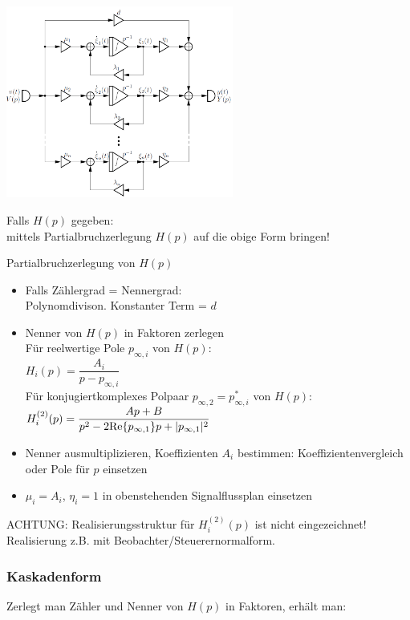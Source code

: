 \documentclass[a4paper,landscape,6pt]{article}
\begin{document}
\begin{multicols}{3}
\begin{minipage}[h]{0.5\textwidth}
	\includegraphics[width=0.56\textwidth]{images_ssp/Parallelform}\\
\end{minipage}
\newpage
Falls  $H(p)$  gegeben:\\
mittels Partialbruchzerlegung $H(p)$ auf die obige Form bringen!
\begin{cookbox}{Partialbruchzerlegung von $H(p)$}
	\begin{itemize}
		\item[1)] Falls Zählergrad = Nennergrad:\\ Polynomdivison. Konstanter Term = $d$
		\item[2)] Nenner von $H(p)$ in Faktoren zerlegen\\
		Für reelwertige Pole $p_{\infty,i}$ von $H(p)$:\\
		$H_i(p) = \dfrac{A_i}{p - p_{\infty,i}}$\\
		Für konjugiertkomplexes Polpaar $p_{\infty,2} = p_{\infty,i}^*$ von $H(p)$:\\
		$H_i^{(2)}(p) = \dfrac{A p + B}{p^2 - 2 \textmd{Re}{\{p_{\infty,1}\}}p + |p_{\infty,1}|^2}$
		\item[3)] Nenner ausmultiplizieren, Koeffizienten $A_i$ bestimmen:
		Koeffizientenvergleich oder Pole für $p$ einsetzen
		\item[4)] $\mu_i = A_i$, $\eta_i = 1$ in obenstehenden Signalflussplan einsetzen
	\end{itemize}
ACHTUNG: Realisierungsstruktur für $H_i^{(2)}(p)$ ist nicht eingezeichnet!\\
Realisierung z.B. mit Beobachter/Steuerernormalform.
	
\end{cookbox}


\subsubsection*{Kaskadenform}
Zerlegt man Zähler und Nenner von $H(p)$ in Faktoren, erhält man:\\


\end{multicols}
\end{document}
